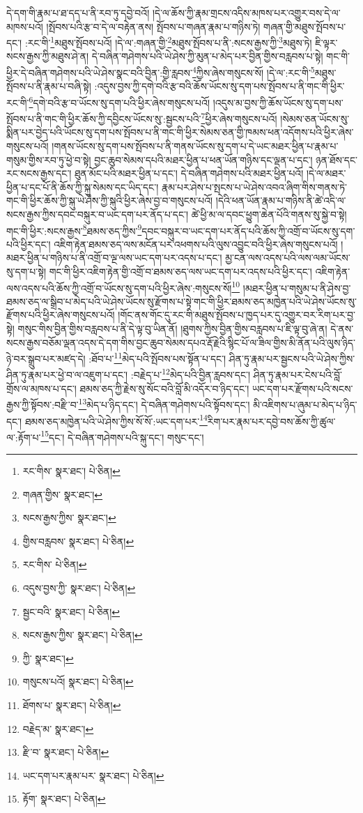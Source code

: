 དེ་དག་གི་རྣམ་པ་ཐ་དད་པ་ནི་རབ་ཏུ་དབྱེ་བའོ། །དེ་ལ་ཆོས་ཀྱི་རྣམ་གྲངས་འདིས་མཁས་པར་འགྱུར་བས་དེ་ལ་མཁས་པའོ། །སྤོབས་པའི་རྩ་བ་དེ་ལ་བརྟེན་ནས། སྤོབས་པ་གཞན་རྣམ་པ་གཉིས་ཏེ། གཞན་གྱི་མཐུས་སྤོབས་པ་དང་། :རང་གི་\footnote{རང་གིས་  སྣར་ཐང་།  པེ་ཅིན། }མཐུས་སྤོབས་པའོ། །དེ་ལ་:གཞན་གྱི་\footnote{གཞན་གྱིས་  སྣར་ཐང་། }མཐུས་སྤོབས་པ་ནི་:སངས་རྒྱས་ཀྱི་\footnote{སངས་རྒྱས་ཀྱིས་  སྣར་ཐང་། }མཐུས་ཏེ། ཇི་ལྟར་སངས་རྒྱས་ཀྱི་མཐུས་ཤེ་ན། དེ་བཞིན་གཤེགས་པའི་ཡེ་ཤེས་ཀྱི་མུན་པ་མེད་པར་བྱིན་གྱིས་བརླབས་པ་སྟེ། གང་གི་ཕྱིར་དེ་བཞིན་གཤེགས་པའི་ཡེ་ཤེས་སྣང་བའི་བྱིན་:གྱི་རླབས་\footnote{གྱིས་བརླབས་  སྣར་ཐང་།  པེ་ཅིན། }ཀྱིས་ཞེས་གསུངས་སོ། །དེ་ལ་:རང་གི་\footnote{རང་གིས་  པེ་ཅིན། }མཐུས་སྤོབས་པ་ནི་རྣམ་པ་བཞི་སྟེ། :འདུས་བྱས་ཀྱི་དགེ་བའི་རྩ་བའི་ཆོས་ཡོངས་སུ་དག་པས་སྤོབས་པ་ནི་གང་གི་ཕྱིར་རང་གི་\footnote{འདུས་བྱས་ཀྱི་  སྣར་ཐང་།  པེ་ཅིན། }དགེ་བའི་རྩ་བ་ཡོངས་སུ་དག་པའི་ཕྱིར་ཞེས་གསུངས་པའོ། །འདུས་མ་བྱས་ཀྱི་ཆོས་ཡོངས་སུ་དག་པས་སྤོབས་པ་ནི་གང་གི་ཕྱིར་ཆོས་ཀྱི་དབྱིངས་ཡོངས་སུ་:སྦྱངས་པའི་\footnote{སྦྱང་བའི་  སྣར་ཐང་།  པེ་ཅིན། }ཕྱིར་ཞེས་གསུངས་པའོ། །སེམས་ཅན་ཡོངས་སུ་སྨིན་པར་བྱེད་པའི་ཡོངས་སུ་དག་པས་སྤོབས་པ་ནི་གང་གི་ཕྱིར་སེམས་ཅན་གྱི་ཁམས་ཕན་འདོགས་པའི་ཕྱིར་ཞེས་གསུངས་པའོ། །གནས་ཡོངས་སུ་དག་པས་སྤོབས་པ་ནི་གནས་ཡོངས་སུ་དག་པ་དེ་ཡང་མཐར་ཕྱིན་པ་རྣམ་པ་གསུམ་གྱིས་རབ་ཏུ་ཕྱེ་བ་སྟེ། བྱང་ཆུབ་སེམས་དཔའི་མཐར་ཕྱིན་པ་ཕན་ཡོན་གཉིས་དང་ལྡན་པ་དང་། ཉན་ཐོས་དང་རང་སངས་རྒྱས་དང་། ཐུན་མོང་པའི་མཐར་ཕྱིན་པ་དང་། དེ་བཞིན་གཤེགས་པའི་མཐར་ཕྱིན་པའོ། །དེ་ལ་མཐར་ཕྱིན་པ་དང་པོ་ནི་ཆོས་ཀྱི་སྐུ་སེམས་དང་ཡིད་དང་། རྣམ་པར་ཤེས་པ་སྤངས་པ་ཡེ་ཤེས་འབའ་ཞིག་གིས་གནས་ཏེ་གང་གི་ཕྱིར་ཆོས་ཀྱི་སྐུ་ཡེ་ཤེས་ཀྱི་སྐུའི་ཕྱིར་ཞེས་བྱ་བ་གསུངས་པའོ། །དེའི་ཕན་ཡོན་རྣམ་པ་གཉིས་ནི་ཚེ་འདི་ལ་སངས་རྒྱས་ཀྱིས་དབང་བསྐུར་བ་ཡང་དག་པར་ནོད་པ་དང་། ཚེ་ཕྱི་མ་ལ་དབང་ཕྱུག་ཆེན་པོའི་གནས་སུ་སྐྱེ་བ་སྟེ། གང་གི་ཕྱིར་:སངས་རྒྱས་\footnote{སངས་རྒྱས་ཀྱིས་  སྣར་ཐང་།  པེ་ཅིན། }ཐམས་ཅད་ཀྱིས་\footnote{ཀྱི་  སྣར་ཐང་། }དབང་བསྐུར་བ་ཡང་དག་པར་ནོད་པའི་ཆོས་ཀྱི་འགྲོ་བ་ཡོངས་སུ་དག་པའི་ཕྱིར་དང་། འཇིག་རྟེན་ཐམས་ཅད་ལས་མངོན་པར་འཕགས་པའི་ལུས་འབྱུང་བའི་ཕྱིར་ཞེས་གསུངས་པའོ། །མཐར་ཕྱིན་པ་གཉིས་པ་ནི་འགྲོ་བ་ལྔ་ལས་ཡང་དག་པར་འདས་པ་དང་། མྱ་ངན་ལས་འདས་པའི་ལས་ལམ་ཡོངས་སུ་དག་པ་སྟེ། གང་གི་ཕྱིར་འཇིག་རྟེན་གྱི་འགྲོ་བ་ཐམས་ཅད་ལས་ཡང་དག་པར་འདས་པའི་ཕྱིར་དང་། འཇིག་རྟེན་ལས་འདས་པའི་ཆོས་ཀྱི་འགྲོ་བ་ཡོངས་སུ་དག་པའི་ཕྱིར་ཞེས་:གསུངས་སོ།\footnote{གསུངས་པའོ།  སྣར་ཐང་།  པེ་ཅིན། } །མཐར་ཕྱིན་པ་གསུམ་པ་ནི་ཤེས་བྱ་ཐམས་ཅད་ལ་སྒྲིབ་པ་མེད་པའི་ཡེ་ཤེས་ཡོངས་སུ་རྫོགས་པ་སྟེ་གང་གི་ཕྱིར་ཐམས་ཅད་མཁྱེན་པའི་ཡེ་ཤེས་ཡོངས་སུ་རྫོགས་པའི་ཕྱིར་ཞེས་གསུངས་པའོ། །གོང་ནས་གོང་དུ་རང་གི་མཐུས་སྤོབས་པ་ཁྱད་པར་དུ་འགྱུར་བར་རིག་པར་བྱ་སྟེ། གསུང་གིས་བྱིན་གྱིས་བརླབས་པ་ནི་དེ་ལྟ་བུ་ཡིན་ནོ། །ཐུགས་ཀྱིས་བྱིན་གྱིས་བརླབས་པ་ཇི་ལྟ་བུ་ཞེ་ན། དེ་ནས་སངས་རྒྱས་བཅོམ་ལྡན་འདས་དེ་དག་གིས་བྱང་ཆུབ་སེམས་དཔའ་རྡོ་རྗེའི་སྙིང་པོ་ལ་ཟིལ་གྱིས་མི་ནོན་པའི་ལུས་ཉིད་ཉེ་བར་སྒྲུབ་པར་མཛད་དེ། :ཐོབ་པ་\footnote{ཐོགས་པ་  སྣར་ཐང་།  པེ་ཅིན། }མེད་པའི་སྤོབས་པས་སྟོན་པ་དང་། ཤིན་ཏུ་རྣམ་པར་སྦྱངས་པའི་ཡེ་ཤེས་ཀྱིས་ཤིན་ཏུ་རྣམ་པར་ཕྱེ་བ་ལ་འཇུག་པ་དང་། :བརྗེད་པ་\footnote{བརྗེད་མ་  སྣར་ཐང་། }མེད་པའི་བྱིན་རླབས་དང་། ཤིན་ཏུ་རྣམ་པར་ངེས་པའི་བློ་གྲོས་ལ་མཁས་པ་དང་། ཐམས་ཅད་ཀྱི་རྗེས་སུ་སོང་བའི་བློ་མི་འདོར་བ་ཉིད་དང་། ཡང་དག་པར་རྫོགས་པའི་སངས་རྒྱས་ཀྱི་སྟོབས་:བརྫི་བ་\footnote{རྫི་བ་  སྣར་ཐང་།  པེ་ཅིན། }མེད་པ་ཉིད་དང་། དེ་བཞིན་གཤེགས་པའི་སྟོབས་དང་། མི་འཇིགས་པ་ཞུམ་པ་མེད་པ་ཉིད་དང་། ཐམས་ཅད་མཁྱེན་པའི་ཡེ་ཤེས་ཀྱིས་སོ་སོ་:ཡང་དག་པར་\footnote{ཡང་དག་པར་རྣམ་པར་  སྣར་ཐང་།  པེ་ཅིན། }རིག་པར་རྣམ་པར་དབྱེ་བས་ཆོས་ཀྱི་ཚུལ་ལ་:རྟོག་པ་\footnote{རྟོག་  སྣར་ཐང་།  པེ་ཅིན། }དང་། དེ་བཞིན་གཤེགས་པའི་སྐུ་དང་། གསུང་དང་། 